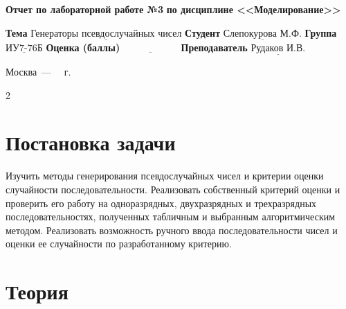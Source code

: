 \documentclass[12pt]{report}
\begin{document}
\begin{titlepage}
		\begin{center}
			\noindent\begin{minipage}{1.1\textwidth}\centering
				\Large\textbf{Отчет по лабораторной работе №3}\newline
				\textbf{по дисциплине <<Моделирование>>}\newline\newline
			\end{minipage}
		\end{center}
		
		\noindent\textbf{Тема} $\underline{\text{Генераторы псевдослучайных чисел}}$\newline\newline
		\noindent\textbf{Студент} $\underline{\text{Слепокурова М.Ф.}}$\newline\newline
		\noindent\textbf{Группа} $\underline{\text{ИУ7-76Б}}$\newline\newline
		\noindent\textbf{Оценка (баллы)} $\underline{\text{~~~~~~~~~~~~~~~~~}}$\newline\newline
		\noindent\textbf{Преподаватель} $\underline{\text{Рудаков И.В.}}$\newline\newline\newline
		
		\begin{center}
			\vfill
			Москва~---~\the\year
			~г.
		\end{center}
	\end{titlepage}

\setcounter{page} {2}





\section*{Постановка задачи}
Изучить методы генерирования псевдослучайных чисел и критерии оценки случайности последовательности. Реализовать собственный критерий оценки и проверить его работу на одноразрядных, двухразрядных и трехразрядных последовательностях, полученных табличным и выбранным алгоритмическим методом. Реализовать возможность ручного ввода последовательности чисел и оценки ее случайности по разработанному критерию.

\section*{Теория}
\end{document}
